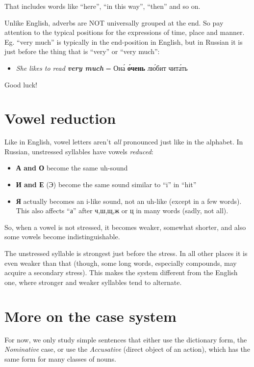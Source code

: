 That includes words like ``here'', ``in this way'', ``then'' and so on.

Unlike English, adverbs are NOT universally grouped at the end. So pay
attention to the typical positions for the expressions of time, place
and manner. Eg. ``very much'' is typically in the end-position in
English, but in Russian it is just before the thing that is ``very'' or
``very much'':

\begin{itemize}
\tightlist
\item
  \emph{She likes to read \textbf{very much}} = Он\'{а} \textbf{\'{о}чень} л\'{ю}бит
  чит\'{а}ть
\end{itemize}

Good luck!

\section{Vowel reduction}\label{vowel-reduction}

Like in English, vowel letters aren't \emph{all} pronounced just like in
the alphabet. In Russian, unstressed syllables have vowels
\emph{reduced}:

\begin{itemize}
\tightlist
\item
  \textbf{А and О} become the same uh-sound
\item
  \textbf{И and Е} (Э) become the same sound similar to ``i'' in ``hit''
\item
  \textbf{Я} actually becomes an i-like sound, not an uh-like (except in
  a few words). This also affects ``а'' after ч,ш,щ,ж or ц in many words
  (sadly, not all).
\end{itemize}

So, when a vowel is not stressed, it becomes weaker, somewhat shorter,
and also some vowels become indistinguishable.

The unstressed syllable is strongest just before the stress. In all
other places it is even weaker than that (though, some long words,
especially compounds, may acquire a secondary stress). This makes the
system different from the English one, where stronger and weaker
syllables tend to alternate.

\section{More on the case system}\label{more-on-the-case-system}

For now, we only study simple sentences that either use the dictionary
form, the \emph{Nominative} case, or use the \emph{Accusative} (direct
object of an action), which has the same form for many classes of nouns.

